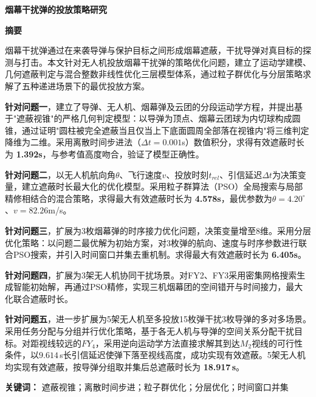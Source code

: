 \documentclass[12pt,a4paper]{article}
\begin{document}
\begin{center}
{\bfseries 烟幕干扰弹的投放策略研究}
\end{center}

\begin{center}
{\bfseries 摘\quad 要}
\end{center}

\noindent 烟幕干扰弹通过在来袭导弹与保护目标之间形成烟幕遮蔽，干扰导弹对真目标的探测与打击。本文针对无人机投放烟幕干扰弹的策略优化问题，建立了运动学建模、几何遮蔽判定与混合整数非线性优化三层模型体系，通过粒子群优化与分层策略求解了五种递进场景下的最优投放方案。

\noindent \textbf{针对问题一}，建立了导弹、无人机、烟幕弹及云团的分段运动学方程，并提出基于"遮蔽视锥"的严格几何判定模型：以导弹为顶点、烟幕云团球为内切球构成圆锥，通过证明"圆柱被完全遮蔽当且仅当上下底面圆周全部落在视锥内"将三维判定降维为二维。采用离散时间步进法（$\Delta t=0.001$s）数值积分，求得有效遮蔽时长为 \textbf{1.392s}，与参考值高度吻合，验证了模型正确性。

\noindent \textbf{针对问题二}，以无人机航向角$\theta$、飞行速度$v$、投放时刻$t_{rel}$、引信延迟$\Delta t$为决策变量，建立遮蔽时长最大化的优化模型。采用粒子群算法（PSO）全局搜索与局部精修相结合的混合策略，求得最大有效遮蔽时长为 \textbf{4.578s}，最优参数为$\theta=4.20^\circ$、$v=82.26$m/s。

\noindent \textbf{针对问题三}，扩展为3枚烟幕弹的时序接力优化问题，决策变量增至8维。采用分层优化策略：以问题二最优解为初始方案，对3枚弹的航向、速度与时序参数进行联合PSO搜索，并引入时间窗口并集去重机制。求得最大有效遮蔽时长为 \textbf{6.405s}。

\noindent \textbf{针对问题四}，扩展为3架无人机协同干扰场景。对FY2、FY3采用密集网格搜索生成智能初始解，再通过PSO精修，实现三机烟幕团的空间错开与时间接力，最大化联合遮蔽时长。

\noindent \textbf{针对问题五}，进一步扩展为5架无人机至多投放15枚弹干扰3枚导弹的多对多场景。采用任务分配与分组并行优化策略，基于各无人机与导弹的空间关系分配干扰目标。对距视线较远的$FY_4$，采用逆向运动学方法直接求解其到达$M_2$视线的可行性条件，以$9.614$\,s长引信延迟使弹下落至视线高度，成功实现有效遮蔽。5架无人机均实现有效遮蔽，按导弹分组取并集后总遮蔽时长为 \textbf{18.917\,s}。

\noindent \textbf{关键词：} 遮蔽视锥；离散时间步进；粒子群优化；分层优化；时间窗口并集

\newpage
\end{document}
